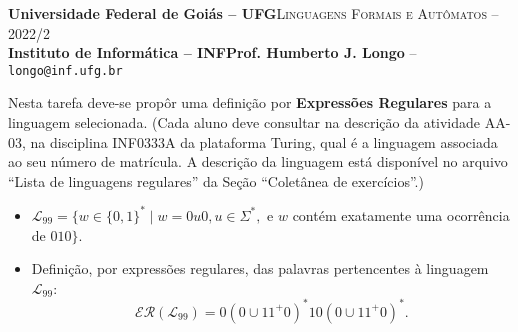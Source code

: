 \documentclass[12pt]{article}
\def\discente{Fulana(o) de tal}
\def\matricula{20010101}
\def\ua{03}
\def\myling{{99}} %
\begin{document}
 \begin{tcolorbox}[rounded corners, colback=blue!3, colframe=blue!40!black]
  \footnotesize\textbf{Universidade Federal de Goiás -- UFG}\hfill \textsc{Linguagens Formais e Autômatos -- 2022/2}\\
  \footnotesize\textbf{Instituto de Informática -- INF\hfill Prof. Humberto J. Longo} -- \scriptsize\texttt{longo@inf.ufg.br}
 \end{tcolorbox}\bigskip
%
\begin{tcolorbox}[rounded corners, colback=blue!2, colframe=blue!40!black, title=\textbf{Atividade AA-\ua}]
   Nesta tarefa deve-se propôr uma definição por \textbf{Expressões Regulares} para a linguagem selecionada. (Cada aluno deve consultar na descrição da atividade AA-\ua, na disciplina INF0333A da plataforma Turing, qual é a linguagem associada ao seu número de matrícula. A descrição da linguagem está disponível no arquivo ``Lista de linguagens regulares'' da Seção ``Coletânea de exercícios''.)
\end{tcolorbox}\bigskip
%
\begin{tcolorbox}[rounded corners, colback=yellow!5, colframe=red!40!black, title=\textbf{\matricula\ -- \discente}]
 \begin{itemize}[leftmargin=*]
% 
  \item $\mathcal{L}_\myling = \{w\in\{0,1\}^*\mid w=0u0, u\in\Sigma^*,$ e $w$ contém exatamente uma ocorrência de $010\}$.
%
  \item Definição, por expressões regulares, das palavras pertencentes à linguagem $\mathcal{L}_\myling$:
   $$\mathcal{ER}(\mathcal{L}_\myling) =
    0(0\cup 11^+0)^*10(0\cup 11^+0)^*
   .$$
 \end{itemize}
\end{tcolorbox}
%
\end{document}

